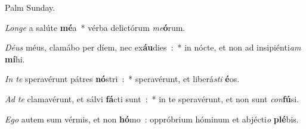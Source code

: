 \documentclass[letterpaper,12pt]{article} %
\begin{document}
\setlength{\columnsep}{18pt}
\setlength{\columnseprule}{1pt}

\def\greinitialformat#1{%
{\fontsize{36}{36}\selectfont #1}%
}

\def\annot{Grad.}
\def\annottwo{4. E}
{


{\centering\Large Palm Sunday.\\}
\bigskip
{}}

\bigskip

{\def\annot{Tract.}
\def\annottwo{2. D}
{}
}
\newenvironment{tractverses}[1][0]{
\begin{list}{\arabic{tractvcount}.}{
\setlength\baselineskip{0pt}
\setlength\itemsep{1pt}
\usecounter{tractvcount}
\setlength\parsep{0pt}
\setlength\labelwidth{50pt}\setlength\leftmargin{0pt}\setlength\itemindent{6ex}}
\setcounter{tractvcount}{#1}
}{\end{list}}

\begin{psalmverses}[1]
\item \emph{Longe} a salúte \textbf{mé}a~* vérba delictórum \emph{me}\textbf{ó}rum.
\item \emph{Déus} méus, clamábo per díem, nec ex\textbf{áu}dies~:~* in nócte, et non ad insipiénti\emph{am} \textbf{mí}hi.
\end{psalmverses}

\bigskip{}
\vspace{-0.7\baselineskip}
\begin{psalmverses}[4]
\item \emph{In te} speravérunt pátres \textbf{nó}stri~:~* speravérunt, et liberá\emph{sti} \textbf{é}os.
\item \emph{Ad te} clamavérunt, et sálvi \textbf{fá}cti sunt~:~* in te speravérunt, et non sunt \emph{con}\textbf{fú}si.
\item \emph{Ego} autem sum vérmis, et non \textbf{hó}mo~: oppróbrium hóminum et abjécti\emph{o} \textbf{plé}bis.
\end{psalmverses}
\end{document}
